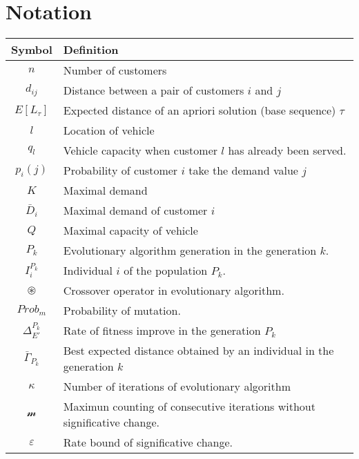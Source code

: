\chapter*{Notation}
\label{chap:notation}

\begin{table}
 \begin{tabular}{c l}
  \hline
  \textbf{Symbol} & \textbf{Definition}\\
  \hline
  $n$ & Number of customers\\
  $d_{ij}$ & Distance between a pair of customers $i$ and $j$\\
  $E[L_{\tau}]$ & Expected distance of an apriori solution (base sequence) $\tau$\\
  $l$ & Location of vehicle\\
  $q_l$ & Vehicle capacity when customer $l$ has already been served.\\
  $p_i(j)$ & Probability of customer $i$ take the demand value $j$\\
  $K$ & Maximal demand\\
  $\bar{D}_i$ & Maximal demand of customer $i$\\
  $Q$ & Maximal capacity of vehicle\\
  $P_k$ & Evolutionary algorithm generation in the generation $k$.\\
  $I^{P_k}_i$ & Individual $i$ of the population $P_k$.\\
  $\circledast$ & Crossover operator in evolutionary algorithm.\\
  $Prob_m$ & Probability of mutation.\\
  $\Delta^{P_k}_{E'}$ & Rate of fitness improve in the generation $P_k$\\
  $\bar{\Gamma}_{P_k}$ & Best expected distance obtained by an individual in the generation $k$\\
  $\kappa$ & Number of iterations of evolutionary algorithm\\
  $\mathcal{m}$ & Maximun counting of consecutive iterations without significative change.\\
  $\varepsilon$ & Rate bound of significative change.\\
  \hline
 \end{tabular}

\end{table}
